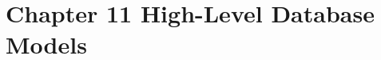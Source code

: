 \documentclass[../../main.tex]{subfiles}
\begin{document}
\section{Chapter 11 High-Level Database Models}





\end{document}
